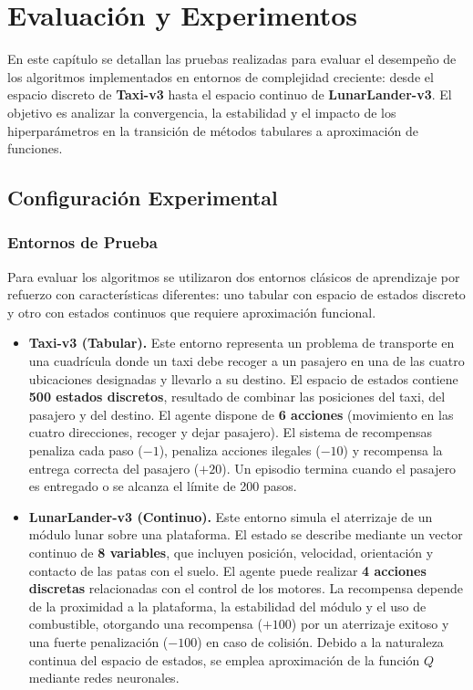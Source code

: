 \section{Evaluación y Experimentos}

En este capítulo se detallan las pruebas realizadas para evaluar el desempeño de los algoritmos implementados en entornos de complejidad creciente: desde el espacio discreto de \textbf{Taxi-v3} hasta el espacio continuo de \textbf{LunarLander-v3}. El objetivo es analizar la convergencia, la estabilidad y el impacto de los hiperparámetros en la transición de métodos tabulares a aproximación de funciones.

\subsection{Configuración Experimental}

\subsubsection{Entornos de Prueba}

Para evaluar los algoritmos se utilizaron dos entornos clásicos de aprendizaje por refuerzo con características diferentes: uno tabular con espacio de estados discreto y otro con estados continuos que requiere aproximación funcional.

\begin{itemize}

\item \textbf{Taxi-v3 (Tabular).}  
Este entorno representa un problema de transporte en una cuadrícula donde un taxi debe recoger a un pasajero en una de las cuatro ubicaciones designadas y llevarlo a su destino. El espacio de estados contiene \textbf{500 estados discretos}, resultado de combinar las posiciones del taxi, del pasajero y del destino. El agente dispone de \textbf{6 acciones} (movimiento en las cuatro direcciones, recoger y dejar pasajero). El sistema de recompensas penaliza cada paso ($-1$), penaliza acciones ilegales ($-10$) y recompensa la entrega correcta del pasajero ($+20$). Un episodio termina cuando el pasajero es entregado o se alcanza el límite de 200 pasos.

\item \textbf{LunarLander-v3 (Continuo).}  
Este entorno simula el aterrizaje de un módulo lunar sobre una plataforma. El estado se describe mediante un vector continuo de \textbf{8 variables}, que incluyen posición, velocidad, orientación y contacto de las patas con el suelo. El agente puede realizar \textbf{4 acciones discretas} relacionadas con el control de los motores. La recompensa depende de la proximidad a la plataforma, la estabilidad del módulo y el uso de combustible, otorgando una recompensa ($+100$) por un aterrizaje exitoso y una fuerte penalización ($-100$) en caso de colisión. Debido a la naturaleza continua del espacio de estados, se emplea aproximación de la función $Q$ mediante redes neuronales.

\end{itemize}

